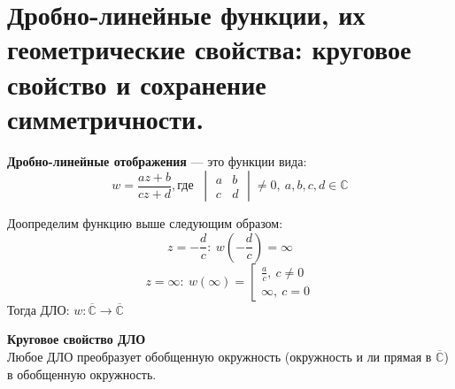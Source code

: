 \newpage
\section{Дробно-линейные функции, их геометрические свойства: круговое свойство и сохранение симметричности.}


\textbf{Дробно-линейные отображения} --- это функции вида: $$w=\frac{az+b}{cz+d}, \text{где } \ \begin{vmatrix}
    a&b\\
    c&d
\end{vmatrix} \neq 0, \ a,b,c,d\in \mathbb{C}$$

Доопределим функцию выше следующим образом:$$z=-\frac{d}{c}: \ w(-\frac{d}{c}) = \infty$$
$$z = \infty: \ w(\infty) = \left[\begin{gathered}\frac{a}{c}, \ c\neq 0\\
\infty, \ c=0
\end{gathered}
\right.$$
Тогда ДЛО: $w: \overline{\mathbb{C}}\to \overline{\mathbb{C}}$


\textbf{Круговое свойство ДЛО}\\
Любое ДЛО преобразует обобщенную окружность (окружность и ли прямая в $\overline{\mathbb{C}}$) в обобщенную окружность.

